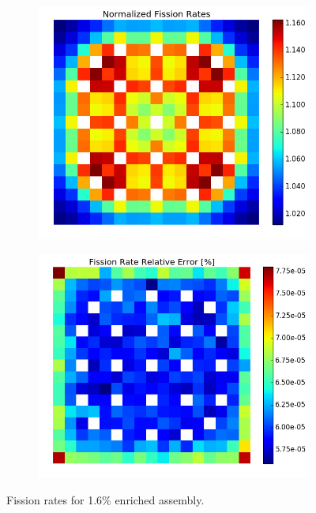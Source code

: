 \begin{figure}[h!]
\centering
\begin{subfigure}{0.5\textwidth}
  \centering
  \includegraphics[width=\linewidth]{figures/benchmarks/fission-rates/fiss-mean-fuel-16}
  \caption{}
  \label{fig:chap7-fiss-rate-mean-1.6-assm}
\end{subfigure}%
\begin{subfigure}{0.5\textwidth}
  \centering
  \includegraphics[width=\linewidth]{figures/benchmarks/fission-rates/fiss-rel-err-fuel-16}
  \caption{}
  \label{fig:chap7-fiss-rate-rel-err-1.6-assm}
\end{subfigure}%
\caption[Fission rates for 1.6\% enriched assembly]{Fission rates for 1.6\% enriched assembly.}
\label{fig:chap7-fiss-rates-1.6-assm}
\end{figure}

